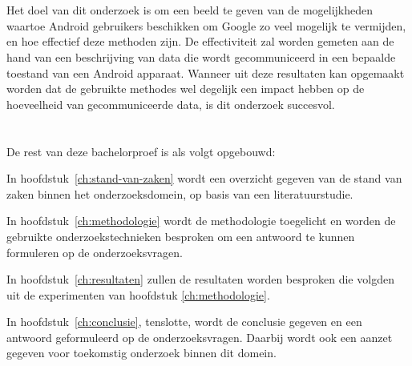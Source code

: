 \section{}
\label{sec:onderzoeksdoelstelling}

Het doel van dit onderzoek is om een beeld te geven van de mogelijkheden waartoe Android gebruikers beschikken om Google zo veel mogelijk te vermijden, en hoe effectief deze methoden zijn. De effectiviteit zal worden gemeten aan de hand van een beschrijving van data die wordt gecommuniceerd in een bepaalde toestand van een Android apparaat. Wanneer uit deze resultaten kan opgemaakt worden dat de gebruikte methodes wel degelijk een impact hebben op de hoeveelheid van  gecommuniceerde data, is dit onderzoek succesvol.

\section{}
\label{sec:opzet-bachelorproef}


De rest van deze bachelorproef is als volgt opgebouwd:

In hoofdstuk~\ref{ch:stand-van-zaken} wordt een overzicht gegeven van de stand van zaken binnen het onderzoeksdomein, op basis van een literatuurstudie.

In hoofdstuk~\ref{ch:methodologie} wordt de methodologie toegelicht en worden de gebruikte onderzoekstechnieken besproken om een antwoord te kunnen formuleren op de onderzoeksvragen.

In hoofdstuk~\ref{ch:resultaten} zullen de resultaten worden besproken die volgden uit de experimenten van hoofdstuk \ref{ch:methodologie}.

In hoofdstuk~\ref{ch:conclusie}, tenslotte, wordt de conclusie gegeven en een antwoord geformuleerd op de onderzoeksvragen. Daarbij wordt ook een aanzet gegeven voor toekomstig onderzoek binnen dit domein.